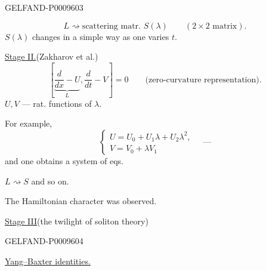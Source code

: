 \begin{GelfandAdjacentEvidence}{GELFAND-P000960}{3}

\begin{equation*}
 L\rightsquigarrow\text{scattering matr. }S(\lambda)\qquad(2\times2\text{ matrix}).\tag{4}
\end{equation*}
$S(\lambda)$ changes in a simple way as one varies $t$.

\underline{Stage II.}\quad (Zakharov et al.)
\begin{equation*}
 \left[\underbrace{\frac{d}{dx}-U}_{L},\frac{d}{dt}-V\right]=0
 \qquad\text{(zero-curvature representation)}.\tag{5}
\end{equation*}
$U,V$ --- rat. functions of $\lambda$.

For example,
\begin{equation*}
 \begin{cases}
 U=U_0+U_1\lambda+U_2\lambda^2,\\
 V=V_0+\lambda V_1
 \end{cases}\quad\text{---}\tag{6}
\end{equation*}
and one obtains a system of eqs.

$L\rightsquigarrow S$ and so on.

The Hamiltonian character was observed.

\underline{Stage III}\quad (the twilight of soliton theory)
\end{GelfandAdjacentEvidence}
\begin{GelfandAdjacentEvidence}{GELFAND-P000960}{4}


\underline{Yang–Baxter identities.}
\end{GelfandAdjacentEvidence}
